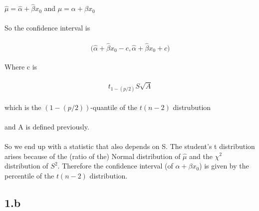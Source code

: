 \documentclass[11pt]{article}   	%
\begin{document}
$ \hat{\mu} = \hat{\alpha} + \hat{\beta} x_0 $ and $ \mu = \alpha + \beta x_0 $ \\
\\
So the confidence interval is \\
\\
\[ \bigg( \hat{\alpha} + \hat{\beta} x_0 - c, \hat{\alpha} + \hat{\beta} x_0 + c \bigg) \]
\\
Where c is \\
\
\[ t_{1 - (p/2)} S \sqrt{A} \]
\\
which is the $ (1-(p/2))$-quantile of the $ t(n - 2) $ distrubution \\
\\
and A is defined previously. \\
\\
So we end up with a statistic that also depends on S. The student's t distribution arises because of the (ratio of the) Normal distribution of $ \hat{\mu} $ and the $ \chi^2 $ distribution of $ S^2 $. Therefore the confidence interval (of $ \alpha + \beta x_0 $) is given by the percentile of the $ t(n-2) $ distribution.


\subsection*{1.b}
\end{document}
